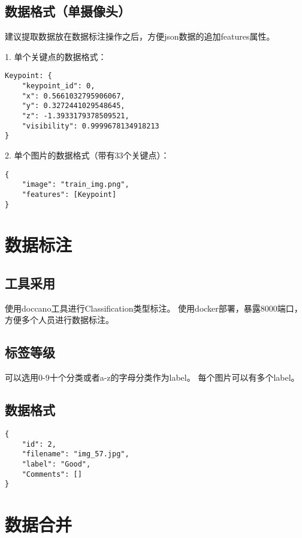\subsection{数据格式（单摄像头）}

建议提取数据放在数据标注操作之后，方便json数据的追加features属性。

1. 单个关键点的数据格式：

\begin{lstlisting}
Keypoint: {
    "keypoint_id": 0,
    "x": 0.5661032795906067,
    "y": 0.3272441029548645,
    "z": -1.3933179378509521,
    "visibility": 0.9999678134918213
}
\end{lstlisting}

2. 单个图片的数据格式（带有33个关键点）：

\begin{lstlisting}
{
    "image": "train_img.png",
    "features": [Keypoint]
}
\end{lstlisting}

\section{数据标注}

\subsection{工具采用}

使用doccano工具进行Classification类型标注。
使用docker部署，暴露8000端口，方便多个人员进行数据标注。

\subsection{标签等级}

可以选用0-9十个分类或者a-z的字母分类作为label。
每个图片可以有多个label。

\subsection{数据格式}

\begin{lstlisting}
{
    "id": 2,
    "filename": "img_57.jpg",
    "label": "Good",
    "Comments": []
}
\end{lstlisting}

\section{数据合并}

